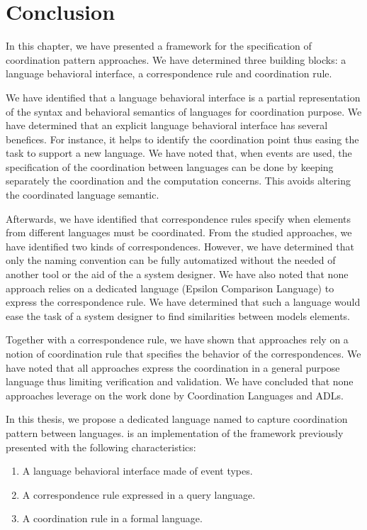 \section{Conclusion}

In this chapter, we have presented a framework for the specification of coordination pattern approaches. We have determined three building blocks: a language behavioral interface, a correspondence rule and coordination rule.    

We have identified that a language behavioral interface is a partial representation of the syntax and behavioral semantics of languages for coordination purpose. We have determined that an explicit language behavioral interface has several benefices. For instance, it helps to identify the coordination point thus easing the task to support a new language. We have noted that, when events are used, the specification of the coordination between languages can be done by keeping separately the coordination and the computation concerns. This avoids altering the coordinated language semantic.

Afterwards, we have identified that correspondence rules specify when elements from different languages must be coordinated. From the studied approaches, we have identified two kinds of correspondences. However, we have determined that only the naming convention can be fully automatized without the needed of another tool or the aid of the a system designer. We have also noted that none approach relies on a dedicated language (\eg Epsilon Comparison Language) to express the correspondence rule. We have determined that such a language would ease the task of a system designer to find similarities between models elements.  

Together with a correspondence rule, we have shown that approaches rely on a notion of coordination rule that specifies the behavior of the correspondences. We have noted that all approaches express the coordination in a general purpose language thus limiting verification and validation. We have concluded that none approaches leverage on the work done by Coordination Languages and ADLs. 

In this thesis, we propose a dedicated language named \bcool to capture coordination pattern between languages. \bcool is an implementation of the framework previously presented with the following characteristics: 

\begin{enumerate}
	\item A language behavioral interface made of event types. 
	\item A correspondence rule expressed in a query language. 
	\item A coordination rule in a formal language. 
\end{enumerate}

